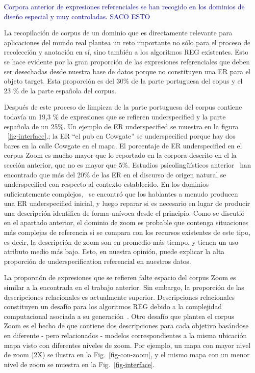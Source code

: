 \textcolor{blue}{Corpora anterior de expresiones referenciales se han recogido en los dominios de dise\~no especial y muy controladas. SACO ESTO}

La recopilaci\'on de corpus de un dominio que es directamente relevante para aplicaciones del mundo real plantea un reto importante no s\'olo para el proceso de recolecci\'on y anotaci\'on en s\'{i}, sino tambi\'en a los algoritmos REG existentes. Esto se hace evidente por la gran proporci\'on de las expresiones referenciales que deben ser desechadas desde nuestra base de datos porque no constituyen una ER para el objeto target. Esta proporci\'on es del 30\% de la parte portuguesa del copus y el 23 \% de la parte espa\~nola del corpus.


Despu\'es de este proceso de limpieza de la parte portuguesa del corpus contiene todav\'{i}a un 19,3 \% de expresiones que se refieren underspecified y la parte espa\~nola de un 25\%. Un ejemplo de ER underspecified se muestra en la figura ~\ref{fig-interface}.; la ER ``el pub en Cowgate'' se underspecified porque hay dos bares en la calle Cowgate en el mapa. El porcentaje de ER underspecified en el corpus Zoom es mucho mayor que lo reportado en la corpora descrito en el la secci\'on anterior, que no es mayor que 5\%. Estudios psicoling\"u\'{i}sticos anterior~\cite{Clark1986} han encontrado que m\'as del 20\% de las ER en el discurso de origen natural se underspecified con respecto al contexto establecido. En los dominios suficientemente complejos,~\cite{Clark1986} se encontr\'o que los hablantes a menudo producen una ER underspecified inicial, y luego reparar si es necesario en lugar de producir una descripci\'on identifica de forma un\'{i}voca desde el principio. Como se discuti\'o en el apartado anterior, el dominio de zoom es probable que contenga situaciones m\'as complejas de referencia si se compara con los recursos existentes de este tipo, es decir, la descripci\'on de zoom son en promedio m\'as tiempo, y tienen un uso atributo medio m\'as bajo. Esto, en nuestra opini\'on, puede explicar la alta proporci\'on de underspecification referencial en nuestros datos.

La proporci\'on de expresiones que se refieren falte espacio del corpus Zoom es similar a la encontrada en el trabajo anterior. Sin embargo, la proporci\'on de las descripciones relacionales es actualmente superior. Descripciones relacionales constituyen un desaf\'{i}o para los algoritmos REG debido a la complejidad computacional asociada a su generaci\'on~\cite{survey}. Otro desaf\'{i}o que plantea el corpus Zoom es el hecho de que contiene dos descripciones para cada objetivo bas\'andose en diferente - pero relacionados - modelos correspondientes a la misma ubicaci\'on mapa visto con diferentes niveles de zoom. Por ejemplo, un mapa con mayor nivel de zoom (2X) se ilustra en la Fig.~\ref{fig-con-zoom}, y el mismo mapa con un menor nivel de zoom se muestra en la Fig.~\ref{fig-interface}.


